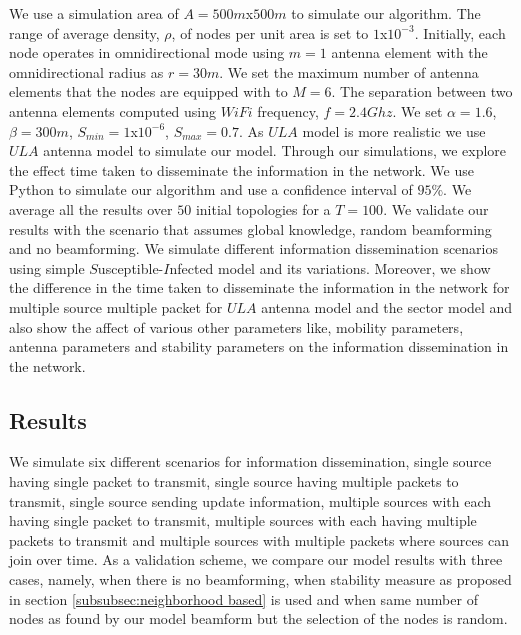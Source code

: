 \documentclass[preprint, twocolumn,5p]{elsarticle}
\begin{document}
We use a simulation area of $A=500m$x$500m$ to simulate our algorithm. The range of average density, $\rho$, of nodes per unit area is set to $1$x$10^{-3}$. Initially, each node operates in omnidirectional mode using $m=1$ antenna element with the omnidirectional radius as $r=30m$. We set the maximum number of antenna elements that the nodes are equipped with to $M=6$. The separation between two antenna elements computed using $WiFi$ frequency, $f=2.4Ghz$. We set $\alpha=1.6$, $\beta=300m$, $S_{min}=1$x$10^{-6}$, $S_{max}=0.7$. As $ULA$ model is more realistic we use $ULA$ antenna model to simulate our model. Through our simulations, we explore the effect time taken to disseminate the information in the network. We use Python to simulate our algorithm and use a confidence interval of $95\%$. We average all the results over $50$ initial topologies for a $T=100$. We validate our results with the scenario that assumes global knowledge, random beamforming and no beamforming. We simulate different information dissemination scenarios using simple $S$usceptible-$I$nfected model and its variations. Moreover, we show the difference in the time taken to disseminate the information in the network for multiple source multiple packet for $ULA$ antenna model and the sector model and also show the affect of various other parameters like, mobility parameters, antenna parameters and stability parameters on the information dissemination in the network.

    \subsection{Results}\label{subsec:result}
    We simulate six different scenarios for information dissemination, single source having single packet to transmit, single source having multiple packets to transmit, single source sending update information, multiple sources with each having single packet to transmit, multiple sources with each having multiple packets to transmit and multiple sources with multiple packets where sources can join over time. As a validation scheme, we compare our model results with three cases, namely, when there is no beamforming, when stability measure as proposed in section \ref{subsubsec:neighborhood based} is used and when same number of nodes as found by our model beamform but the selection of the nodes is random.
\end{document}
